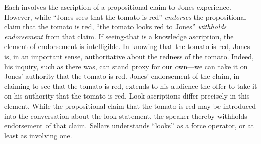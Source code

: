 \documentclass[11pt]{article}
\begin{document}
Each involves the ascription of a propositional claim to Jones experience. However, while ``Jones sees that the tomato is red'' \emph{endorses} the propositional claim that the tomato is red, ``the tomato looks red to Jones'' \emph{withholds endorsement} from that claim. If seeing-that is a knowledge ascription, the element of endorsement is intelligible. In knowing that the tomato is red, Jones is, in an important sense, authoritative about the redness of the tomato. Indeed, his inquiry, such as there was, can stand proxy for our own---we can take it on Jones' authority that the tomato is red. Jones' endorsement of the claim, in claiming to see that the tomato is red, extends to his audience the offer to take it on his authority that the tomato is red. Look ascriptions differ precisely in this element. While the propositional claim that the tomato is red may be introduced into the conversation about the look statement, the speaker thereby withholds endorsement of that claim. Sellars understands ``looks'' as a force operator, or at least as involving one.
\end{document}
